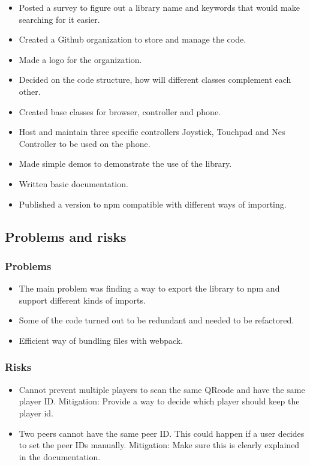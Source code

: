 \documentclass[11pt]{article}
\begin{document}
\begin{itemize}
  \item Posted a survey to figure out a library name and keywords that would make searching for it easier.
  \item Created a Github organization to store and manage the code.
  \item Made a logo for the organization. 
  \item Decided on the code structure, how will different classes complement each other.
  \item Created base classes for browser, controller and phone.
  \item Host and maintain three specific controllers Joystick, Touchpad and Nes Controller to be used on the phone.
  \item Made simple demos to demonstrate the use of the library.
  \item Written basic documentation.
  \item Published a version to npm compatible with different ways of importing. 
\end{itemize}

\subsection{Problems and risks}\label{problems-and-risks}

\subsubsection{Problems}\label{problems}

\begin{itemize}
    \item The main problem was finding a way to export the library to npm and support different kinds of imports. 
    \item Some of the code turned out to be redundant and needed to be refactored. 
    \item Efficient way of bundling files with webpack. 
\end{itemize}

\subsubsection{Risks}\label{risks}

\begin{itemize}
    \item Cannot prevent multiple players to scan the same QRcode and have the same player ID. Mitigation: Provide a way to decide which player should keep the player id. 
    \item Two peers cannot have the same peer ID. This could happen if a user decides to set the peer IDs manually. Mitigation: Make sure this is clearly explained in the documentation. 
    
\end{itemize}
\end{document}
